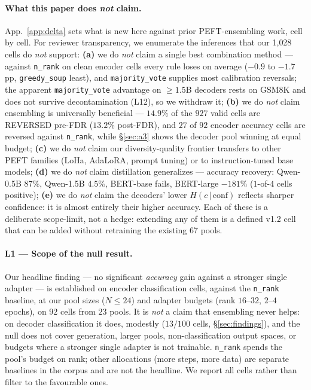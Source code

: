 \documentclass[11pt]{article}
\begin{document}
\paragraph{What this paper does \emph{not} claim.} App.~\ref{app:delta} sets what is new here against prior PEFT-ensembling work, cell by cell. For reviewer transparency, we enumerate the inferences that our 1{,}028 cells do \emph{not} support: \textbf{(a)} we do \emph{not} claim a single best combination method --- against \texttt{n\_rank} on clean encoder cells every rule loses on average ($-0.9$ to $-1.7$pp, \texttt{greedy\_soup} least), and \texttt{majority\_vote} supplies most calibration reversals; the apparent \texttt{majority\_vote} advantage on $\geq 1.5$B decoders rests on GSM8K and does not survive decontamination (L12), so we withdraw it; \textbf{(b)} we do \emph{not} claim ensembling is universally beneficial --- $14.9\%$ of the $927$ valid cells are REVERSED pre-FDR ($13.2\%$ post-FDR), and $27$ of $92$ encoder accuracy cells are reversed against \texttt{n\_rank}, while \S\ref{sec:a3} shows the decoder pool winning at equal budget; \textbf{(c)} we do \emph{not} claim our diversity-quality frontier transfers to other PEFT families (LoHa, AdaLoRA, prompt tuning) or to instruction-tuned base models; \textbf{(d)} we do \emph{not} claim distillation generalizes --- accuracy recovery: Qwen-0.5B $87\%$, Qwen-1.5B $4.5\%$, BERT-base fails, BERT-large $-181\%$ ($1$-of-$4$ cells positive); \textbf{(e)} we do \emph{not} claim the decoders' lower $H(c\,|\,\mathrm{conf})$ reflects sharper confidence: it is almost entirely their higher accuracy. Each of these is a deliberate scope-limit, not a hedge: extending any of them is a defined v1.2 cell that can be added without retraining the existing 67 pools.

\paragraph{L1 — Scope of the null result.} Our headline finding --- no significant \emph{accuracy} gain against a stronger single adapter --- is established on encoder classification cells, against the \texttt{n\_rank} baseline, at our pool sizes ($N{\leq}24$) and adapter budgets (rank $16$--$32$, $2$--$4$ epochs), on $92$ cells from $23$ pools. It is \emph{not} a claim that ensembling never helps: on decoder classification it does, modestly ($13/100$ cells, \S\ref{sec:findings}), and the null does not cover generation, larger pools, non-classification output spaces, or budgets where a stronger single adapter is not trainable. \texttt{n\_rank} spends the pool's budget on rank; other allocations (more steps, more data) are separate baselines in the corpus and are not the headline. We report all cells rather than filter to the favourable ones.
\end{document}
